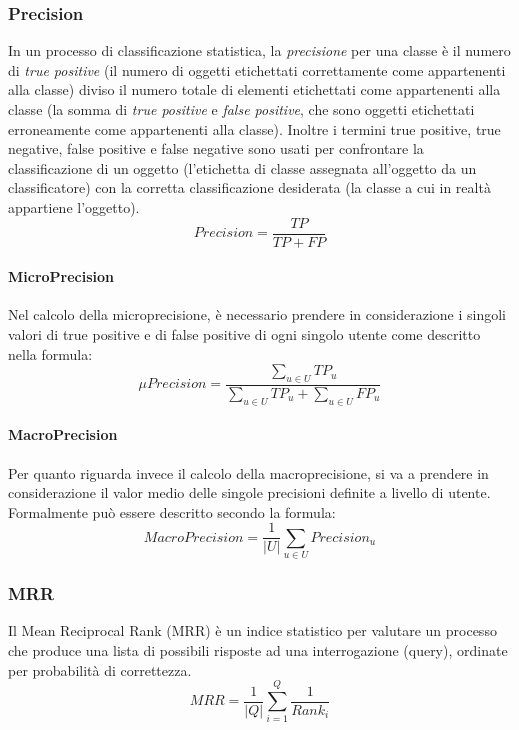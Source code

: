 \subsubsection{Precision}
\label{precision}
In un processo di classificazione statistica, la \emph{precisione} per una classe è il numero di \emph{true positive} (il numero di oggetti etichettati correttamente come appartenenti alla classe) diviso il numero totale di elementi etichettati come appartenenti alla classe (la somma di \emph{true positive} e \emph{false positive}, che sono oggetti etichettati erroneamente come appartenenti alla classe).
Inoltre i termini true positive, true negative, false positive e false negative sono usati per confrontare la classificazione di un oggetto (l’etichetta di classe assegnata all’oggetto da un classificatore) con la corretta classificazione desiderata (la classe a cui in realtà appartiene l’oggetto).
\begin{equation*}
Precision =\frac{TP}{TP+FP}
\end{equation*}

\paragraph{MicroPrecision}
Nel calcolo della microprecisione, è necessario prendere in considerazione i singoli valori di true positive e di false positive di ogni singolo utente come descritto nella formula:
\begin{equation*}
\mu Precision =\frac{\sum\limits_{u\in U}^{}TP_u}{\sum\limits_{u\in U}^{}TP_u+\sum\limits_{u\in U}^{}FP_u}
\end{equation*}

\paragraph{MacroPrecision}
Per quanto riguarda invece il calcolo della macroprecisione, si va a prendere in considerazione il valor medio delle singole precisioni definite a livello di utente. Formalmente può essere descritto secondo la formula:
\begin{equation*}
MacroPrecision =\frac{1}{|U|}\sum\limits_{u\in U}{Precision_u}
\end{equation*}

\subsubsection{MRR}
\label{MRR}
Il Mean Reciprocal Rank (MRR) è un indice statistico per valutare un processo che produce una lista di possibili risposte ad una interrogazione (query), ordinate per probabilità di correttezza.
\begin{equation*}
MRR = \frac{1}{|Q|}\sum_{i=1}^{Q}{\frac{1}{Rank_i}}
\end{equation*}

